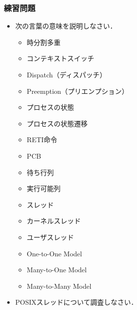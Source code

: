 \documentclass[unicode]{beamer}                   %
\begin{document}
\begin{frame}[fragile]
  \frametitle{練習問題}
  \begin{itemize}
  \item 次の言葉の意味を説明しなさい．
    \begin{itemize}
    \item 時分割多重
    \item コンテキストスイッチ
    \item Dispatch（ディスパッチ）
    \item Preemption（プリエンプション）
    \item プロセスの状態
    \item プロセスの状態遷移
    \item RETI命令
    \item PCB
    \item 待ち行列
    \item 実行可能列
    \item スレッド
    \item カーネルスレッド
    \item ユーザスレッド
    \item One-to-One Model
    \item Many-to-One Model
    \item Many-to-Many Model
    \end{itemize}
  \item POSIXスレッドについて調査しなさい．
  \end{itemize}
\end{frame}
\end{document}
